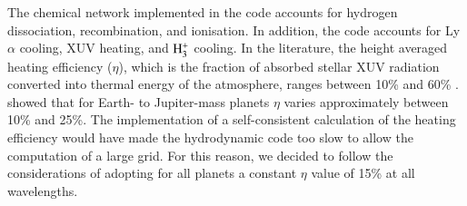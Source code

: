 \documentclass{aa}
\def\hhh{{\rm H_3^+}}
\begin{document}
The chemical network implemented in the code accounts for hydrogen dissociation, recombination, and ionisation. In addition, the code accounts for Ly$\alpha$ cooling, XUV heating, and $\hhh$ cooling. In the literature, the height averaged heating efficiency ($\eta$), which is the fraction of absorbed stellar XUV radiation converted into thermal energy of the atmosphere, ranges between 10\% and 60\% \citep[e.g.,][]{watson1981,yelle2004,murray2009,cecchi2009,owen2012,shematovich2014,salz2016}. \citet{salz2016} showed that for Earth- to Jupiter-mass planets $\eta$ varies approximately between 10\% and 25\%. The implementation of a self-consistent calculation of the heating efficiency would have made the hydrodynamic code too slow to allow the computation of a large grid. For this reason, we decided to follow the considerations of \citet{erkaev2016} adopting for all planets a constant $\eta$ value of 15\% at all wavelengths.
\end{document}
